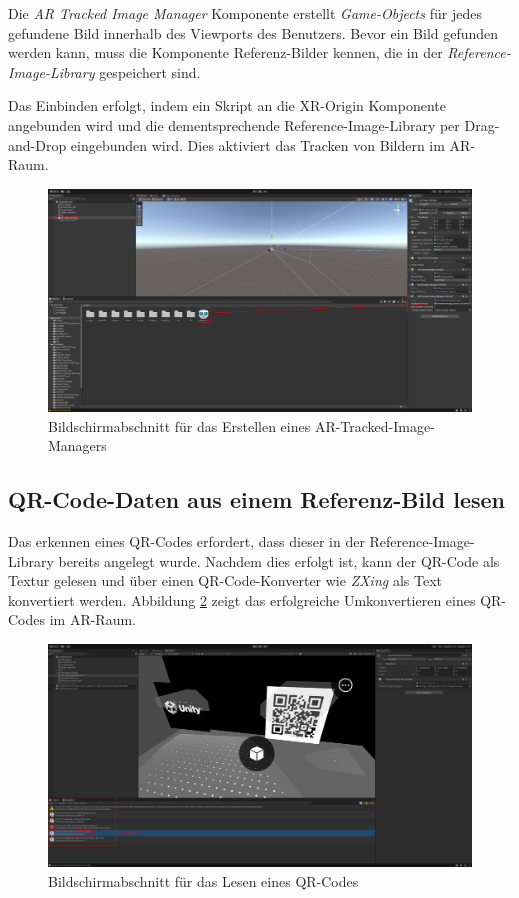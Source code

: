 Die \textit{AR Tracked Image Manager} Komponente erstellt \textit{Game-Objects} für jedes gefundene Bild innerhalb des Viewports des Benutzers. Bevor ein Bild gefunden werden kann, muss die Komponente Referenz-Bilder kennen, die in der \textit{Reference-Image-Library} gespeichert sind.

Das Einbinden erfolgt, indem ein Skript an die XR-Origin Komponente angebunden wird und die dementsprechende Reference-Image-Library per Drag-and-Drop eingebunden wird. Dies aktiviert das Tracken von Bildern im AR-Raum.

\begin{figure}[H]
    \centering
    \includegraphics[width=\textwidth]{images/PrAr_UnityAR-Create-Img-Mngr.png}
    \caption{Bildschirmabschnitt für das Erstellen eines AR-Tracked-Image-Managers}
    \label{fig:implementierung:unity:AR-Create-Img-Mngr}
\end{figure}

\subsection{QR-Code-Daten aus einem Referenz-Bild lesen}

Das erkennen eines QR-Codes erfordert, dass dieser in der Reference-Image-Library bereits angelegt wurde. Nachdem dies erfolgt ist, kann der QR-Code als Textur gelesen und über einen QR-Code-Konverter wie \textit{ZXing} als Text konvertiert werden. Abbildung \ref{fig:implementierung:unity:AR-Read-Qr-Img} zeigt das erfolgreiche Umkonvertieren eines QR-Codes im AR-Raum.

\begin{figure}[H]
    \centering
    \includegraphics[width=\textwidth]{images/PrAr_UnityAR-Read-Qr-Img.png}
    \caption{Bildschirmabschnitt für das Lesen eines QR-Codes}
    \label{fig:implementierung:unity:AR-Read-Qr-Img}
\end{figure}

